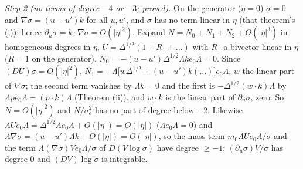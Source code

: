 \emph{Step 2 (no terms of degree $-4$ or $-3$; proved).} On the generator ($\eta = 0$) $\sigma = 0$ and $\nabla\sigma = (u - u')k$ for all $u, u'$, and $\sigma$ has no term linear in $\eta$ (that theorem's (i)); hence $\partial_{u}\sigma = k\cdot\nabla\sigma = O(|\eta|^{2})$. Expand $N = N_{0} + N_{1} + N_{2} + O(|\eta|^{3})$ in homogeneous degrees in $\eta$, $U = \Delta^{1/2}(1 + R_{1} + \ldots)$ with $R_{1}$ a bivector linear in $\eta$ ($R = 1$ on the generator). $N_{0} = -(u - u')\Delta^{1/2}\Lambda ke_{0}\Lambda = 0$. Since $(DU)\sigma = O(|\eta|^{2})$, $N_{1} = -\Lambda\bigl[w\Delta^{1/2} + (u - u')k(\ldots)\bigr]e_{0}\Lambda$, $w$ the linear part of $\nabla\sigma$; the second term vanishes by $\Lambda k = 0$ and the first is $-\Delta^{1/2}(w\cdot k)\Lambda$ by $\Lambda pe_{0}\Lambda = (p\cdot k)\Lambda$ (Theorem (ii)), and $w\cdot k$ is the linear part of $\partial_{u}\sigma$, zero. So $N = O(|\eta|^{2})$ and $N/\sigma_{\epsilon}^{2}$ has no part of degree below $-2$. Likewise $\Lambda Ue_{0}\Lambda = \Delta^{1/2}\Lambda e_{0}\Lambda + O(|\eta|) = O(|\eta|)$ ($\Lambda e_{0}\Lambda = 0$) and $\Lambda\nabla\sigma = (u - u')\Lambda k + O(|\eta|) = O(|\eta|)$, so the mass term $m_{0}\Lambda Ue_{0}\Lambda/\sigma$ and the term $\Lambda(\nabla\sigma)Ve_{0}\Lambda/\sigma$ of $D(V\log\sigma)$ have degree $\ge -1$; $(\partial_{u}\sigma)V/\sigma$ has degree $0$ and $(DV)\log\sigma$ is integrable.

